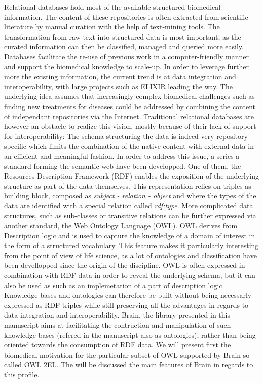 \documentclass{bioinfo}
\begin{document}
Relational databases hold most of the available structured biomedical information. The content of these repositories is often
extracted from scientific literature by manual curation with the help of text-mining tools. The transformation from raw text into
structured data is most important, as the curated information can then be classified, managed and queried more easily. Databases facilitate
the re-use of previous work in a computer-friendly manner and support the biomedical knowledge to scale-up. In order to leverage further 
more the existing information, the current trend is at data integration and interoperability, with large projects such as ELIXIR leading the way.
The underlying idea assumes that increasingly complex biomedical challenges such as finding new treatments for diseases could be addressed 
by combining the content of independant repositories via the Internet. 
Traditional relational databases are however an obstacle to realize this vision, mostly because of their lack of support for interoperability:
The schema structuring the data is indeed very repository-specific which limits the combination of the native content with external data in an
efficient and meaningful fashion. In order to address this issue, a series a standard forming the semantic web have been developped. One of them,
the Resources Description Framework (RDF) enables the exposition of the underlying structure as part of the data themselves. This
representation relies on triples as building block, composed as \emph{subject - relation - object} and where 
the types of the data are identified with a special relation called \emph{rdf:type}. More complicated data structures, such as sub-classes or
transitive relations can be further expressed via another standard, the Web Ontology Language (OWL). OWL derives from Description logic and
is used to capture the knowledge of a domain of interest in the form of a structured vocabulary. This feature makes it particularly 
interesting from the point of view of life science, as a lot of ontologies and classification have been devellopped since the origin of 
the discipline. OWL is often expressed in combination with RDF data in order to reveal the underlying schema, but 
it can also be used as such as an implemetation of a part of description logic. 
Knowledge bases and ontologies can therefore be built without being necessarly expressed as RDF triples while still preserving all the 
advantages in regards to data integration and interoperability.
Brain, the library presented in this manuscript aims at facilitating the contruction and manipulation of 
such knowledge bases (refered in the manuscript also as ontologies), rather than being oriented towards the consumption of RDF data. 
We will present first the biomedical motivation for the particular subset of OWL supported by Brain so called OWL 2EL. 
The will be discussed the main features of Brain in regards to this profile.
\end{document}
